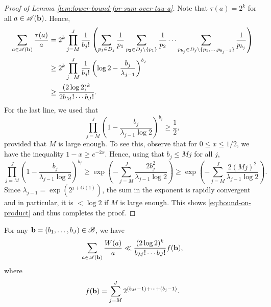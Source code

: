 \begin{proof}[Proof of Lemma \ref{lem:lower-bound-for-sum-over-tau-a}]
    Note that $\tau(a) = 2^k$ for all $a \in \mathscr{A}(\mathbf{b})$.
    Hence, 
    \begin{align*}
        \sum \limits_{a \in \mathscr{A}(\mathbf{b})} \frac{\tau (a)}{a} &= 2^k \prod \limits_{j = M}^J \frac{1}{b_j!} \left( \sum \limits_{p_1 \in D_j} \frac{1}{p_1} \sum \limits_{p_2 \in D_j \setminus \left\{p_1\right\}} \frac{1}{p_2} \cdots \sum \limits_{p_{b_j} \in D_j \setminus \{p_1, \dots, p_{b_j -1}\}} \frac{1}{p_{b_j}}\right) \\
        &\ge 2^k \prod \limits_{j = M}^J \frac{1}{b_j!} \left(\log 2 - \frac{b_j}{\lambda_{j - 1}} \right)^{b_j} \\ 
        &\ge \frac{(2 \log 2)^k}{2 b_M! \cdots b_J!}.
    \end{align*}
    For the last line, we used that
    \begin{equation} \label{eq:bound-on-product}
        \prod\limits_{j = M}^J\left(1 - \frac{b_j}{\lambda_{j - 1} \log 2}\right)^{b_j} \ge \frac{1}{2},
    \end{equation}
    provided that $M$ is large enough.
    To see this, observe that for $0 \le x \le 1/2$, we have the inequality $1 - x \ge e^{-2x}$. 
    Hence, using that $b_j \le Mj$ for all $j$,
    \begin{equation*}
        \prod\limits_{j = M}^J\left(1 - \frac{b_j}{\lambda_{j - 1} \log 2}\right)^{b_j} \ge \exp\left(-\sum_{j = M}^J \frac{2b_j^2}{\lambda_{j - 1} \log 2} \right) \ge \exp\left(-\sum_{j = M}^J \frac{2(Mj)^2}{\lambda_{j - 1} \log 2} \right).
    \end{equation*}
    Since $\lambda_{j - 1} = \exp(2^{j + O(1)})$, the sum in the exponent is rapidly convergent and in particular, it is $< \log 2$ if $M$ is large enough.
    This shows \eqref{eq:bound-on-product} and thus completes the proof.
\end{proof}

\begin{lemma} \label{lem:upper-bound-for-sum-over-W-a}
    For any $\mathbf{b} = (b_1, \dots, b_J) \in \mathscr{B}$, we have
    \begin{equation*}
        \sum \limits_{a \in \mathscr{A} (\mathbf{b})} \frac{W(a)}{a} \ll \frac{(2 \log 2)^{k}}{b_M! \cdots b_J!} f(\mathbf{b}),
    \end{equation*}
    where 
    \begin{equation*}
        f(\mathbf{b}) = \sum \limits_{j = M}^J 2^{(b_M - 1) + \dots + (b_j - 1)}.
    \end{equation*}
\end{lemma}

